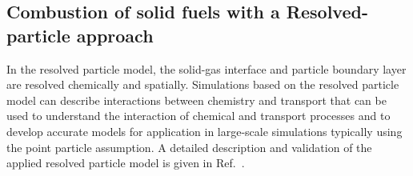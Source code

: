 \begin{btUnit}
\subsection{Combustion of solid fuels with a Resolved-particle approach}
In the resolved particle model, the solid-gas interface and particle boundary layer are resolved chemically and spatially. Simulations based on the resolved particle model can describe interactions between chemistry and transport that can be used to understand the interaction of chemical and transport processes and to develop accurate models for application in large-scale simulations typically using the point particle assumption. A detailed description and validation of the applied resolved particle model is given in Ref.~\cite{Farazi2017}.


\end{btUnit}
